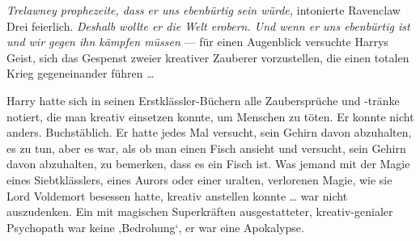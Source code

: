 

\emph{Trelawney prophezeite, dass er uns ebenbürtig sein würde,} intonierte Ravenclaw Drei feierlich. \emph{Deshalb wollte er die Welt erobern. Und wenn er uns ebenbürtig ist und wir gegen ihn kämpfen müssen} — für einen Augenblick versuchte Harrys Geist, sich das Gespenst zweier kreativer Zauberer vorzustellen, die einen totalen Krieg gegeneinander führen …

Harry hatte sich in seinen Erstklässler-Büchern alle Zaubersprüche und -tränke notiert, die man kreativ einsetzen konnte, um Menschen zu töten. Er konnte nicht anders. Buchstäblich. Er hatte jedes Mal versucht, sein Gehirn davon abzuhalten, es zu tun, aber es war, als ob man einen Fisch ansieht und versucht, sein Gehirn davon abzuhalten, zu bemerken, dass es ein Fisch ist. Was jemand mit der Magie eines Siebtklässlers, eines Aurors oder einer uralten, verlorenen Magie, wie sie Lord Voldemort besessen hatte, kreativ anstellen konnte … war nicht auszudenken. Ein mit magischen Superkräften ausgestatteter, kreativ-genialer Psychopath war keine ‚Bedrohung‘, er war eine Apokalypse.



